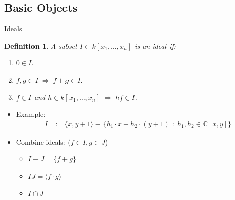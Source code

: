 \documentclass[notes=hide]{beamer}
\newtheorem{defn}{Definition}
\newcommand{\C}{\mathbb{C}}
\newcommand{\mvar}[2]{#1_1,\ldots , #1_{#2}}
\begin{document}
\subsection{Basic Objects}
\begin{frame}{Ideals}
\begin{defn}
A subset $I\subset k[\mvar{x}{n}]$ is an \emph{ideal} if:
\begin{enumerate}
\item $0 \in I$.
\item $f,g\in I \;\Rightarrow \; f+g\in I$.
\item $f\in I$ and $h\in k[\mvar{x}{n}] \;\Rightarrow\; hf\in I$.
\end{enumerate}
\end{defn}
\pause
\begin{itemize}[<+->]
	\item Example: \begin{align*}
		I &:= \langle x,y+1\rangle \equiv \{ h_1 \cdot x + h_2 \cdot (y+1) \; : \; h_1,h_2 \in \C [x,y] \}
		\end{align*}
	\item Combine ideals: ($f\in I, g\in J$)
	\begin{itemize}
		\item $I+J = \{ f+g \}$
		\item $IJ = \langle f \cdot g \rangle$
		\item $I \cap J$
	\end{itemize}
\end{itemize}
\end{frame}
\end{document}
